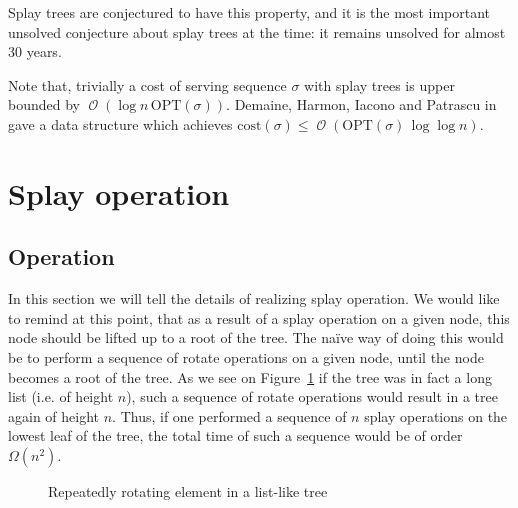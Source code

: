 \documentclass[11pt]{article}
\DeclareMathOperator*{\Oh}{\mathcal{O}}
\begin{document}
\begin{itemize}
		Splay trees are conjectured to have this property, and it is the most important unsolved conjecture about splay trees at the time: it remains unsolved for almost 30 years.

		Note that, trivially a cost of serving sequence $\sigma$ with splay trees is upper bounded by $\Oh(\log n \, \mathrm{OPT}(\sigma))$. Demaine, Harmon, Iacono and Patrascu in~\cite{DBLP:conf/focs/DemaineHIP04} gave a data structure which achieves $\mathrm{cost}(\sigma) \leq \Oh(\mathrm{OPT}(\sigma)\, \log \log n)$.
\end{itemize}
\section{Splay operation}
\label{splay}
\subsection{Operation}
In this section we will tell the details of realizing splay operation. We would like to remind at this point, that as a result of a splay operation on a given node, this node should be lifted up to a root of the tree. The naïve way of doing this would be to perform a sequence of rotate operations on a given node, until the node becomes a root of the tree. As we see on Figure~\ref{gorot} if the tree was in fact a long list (i.e. of height $n$), such a sequence of rotate operations would result in a tree again of height $n$. Thus, if one performed a sequence of $n$ splay operations on the lowest leaf of the tree, the total time of such a sequence would be of order $\Omega(n^2)$.
\begin{figure}
\begin{center}
\usetikzlibrary{shapes}
\end{center}
\caption{\label{gorot}Repeatedly rotating element in a list-like tree}
\end{figure}
\end{document}
